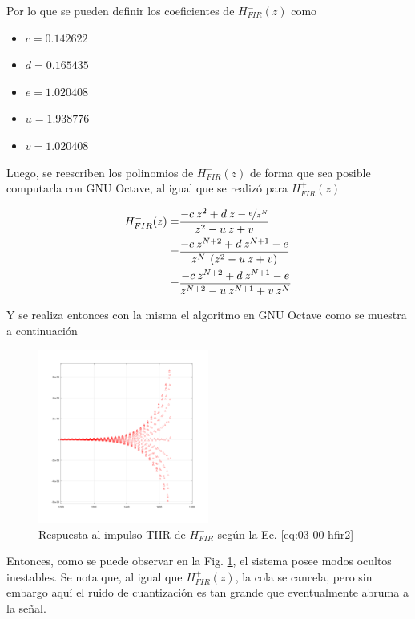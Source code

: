     Por lo que se pueden definir los coeficientes de $H_{FIR}^{-}(z)$ como

    \begin{itemize}
      \item $c = 0.142622$
      \item $d = 0.165435$
      \item $e = 1.020408$
      \item $u = 1.938776$
      \item $v = 1.020408$
    \end{itemize}

    Luego, se reescriben los polinomios de $H_{FIR}^{-}(z)$ de forma que sea posible computarla con GNU Octave, al igual que se realizó para $H_{FIR}^{+}(z)$

    \begin{align}
      H_{FIR}^{-}(z) =& \frac{-c \: z^{2} + d \: z - \nicefrac{e}{z^{N}}}{z^{2} - u \: z + v} \nonumber \\
      =& \frac{-c \: z^{N+2} + d \: z^{N+1} - e}{z^{N} \: \left( z^{2} - u \: z + v \right)} \nonumber \\
      =& \frac{-c \: z^{N+2} + d \: z^{N+1} - e}{z^{N+2} - u \: z^{N+1} + v \: z^{N}}
      \label{eq:03-00-hfir2}
    \end{align}

    Y se realiza entonces con la misma el algoritmo en GNU Octave como se muestra a continuación

    

    \begin{figure}
      \centering
      \includegraphics[width=0.5\textwidth]{../images/tiir_hfir2.png}
      \caption{Respuesta al impulso TIIR de $H_{FIR}^{-}$ según la Ec. \ref{eq:03-00-hfir2}}
      \label{fig:tiir_hfir2}
    \end{figure}

    Entonces, como se puede observar en la Fig. \ref{fig:tiir_hfir2}, el sistema posee modos ocultos inestables. Se nota que, al igual que $H_{FIR}^{+}(z)$, la cola se cancela, pero sin embargo aquí el ruido de cuantización es tan grande que eventualmente abruma a la señal.

    

